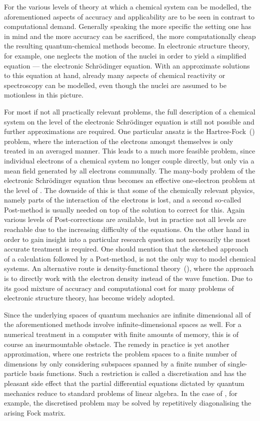 For the various levels of theory
at which a chemical system can be modelled,
the aforementioned aspects of accuracy and applicability
are to be seen in contrast to computational demand.
Generally speaking the more specific the setting one has in mind
and the more accuracy can be sacrificed,
the more computationally cheap the resulting quantum-chemical methods become.
In electronic structure theory, for example,
one neglects the motion of the nuclei
in order to yield a simplified equation --- the electronic Schrödinger equation.
With an approximate solutions to this equation
at hand, already many aspects of chemical reactivity or spectroscopy
can be modelled, even though the nuclei are assumed to be motionless in this picture.

For most if not all practically relevant problems,
the full description of a chemical system
on the level of the electronic Schrödinger equation is still not possible
and further approximations are required.
One particular ansatz is the Hartree-Fock~(\HF) problem,
where the interaction of the electrons amongst themselves
is only treated in an averaged manner.
This leads to a much more feasible problem,
since individual electrons of a chemical system no longer couple directly,
but only via a mean field generated by all electrons communally.
The many-body problem of the electronic Schrödinger equation
thus becomes an effective one-electron problem at the level of \HF.
The downside of this is that some of the chemically relevant physics,
namely parts of the interaction of the electrons is lost,
and a second so-called Post-\HF method is usually needed
on top of the \HF solution to correct for this.
Again various levels of Post-\HF corrections are available,
but in practice not all levels are reachable due to the
increasing difficulty of the equations.
On the other hand in order to gain insight
into a particular research question
not necessarily the most accurate treatment is required.
One should mention that the sketched approach
of a \HF calculation followed by a Post-\HF method,
is not the only way to model chemical systems.
An alternative route is density-functional theory~(\DFT),
where the approach is to directly work with the electron density
instead of the wave function.
Due to its good mixture of accuracy and computational cost
for many problems of electronic structure theory,
\DFT has become widely adopted.

Since the underlying spaces of quantum mechanics are infinite dimensional
all of the aforementioned methods
involve infinite-dimensional spaces as well.
For a numerical treatment in a computer with finite amounts of memory,
this is of course an insurmountable obstacle.
The remedy in practice is yet another approximation,
where one restricts the problem spaces
to a finite number of dimensions by only considering subspaces
spanned by a finite number of single-particle basis functions.
Such a restriction is called a discretisation
and has the pleasant side effect that the partial differential equations
dictated by quantum mechanics
reduce to standard problems of linear algebra.
In the case of \HF, for example,
the discretised problem may be solved by repetitively diagonalising
the arising Fock matrix.

